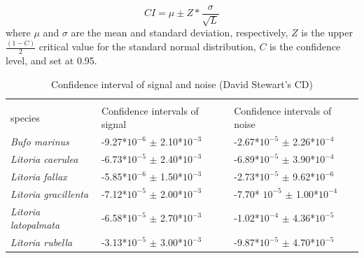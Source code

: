 \begin{equation}
CI=\mu \pm Z*\frac{\sigma}{\sqrt{L}}
\end{equation}
where $\mu$ and $\sigma$ are the mean and standard deviation, respectively, $Z$ is the upper $\frac{(1-C)}{2}$ critical value for the standard normal distribution, $C$ is the confidence level, and set at 0.95.




\begin{table}[htb!]
\centering
\caption[Confidence interval for CD]{Confidence interval of signal and noise (David Stewart's CD)}
\label{tab:CI_CD}
\begin{tabular}{lll}
\hline\hline
    \backslashbox{Frog \\ species}{Parameters}                      & Confidence intervals of signal & Confidence intervals of noise \\ \hline
\textit{Bufo marinus}        &  -9.27*$10^{-6}$ $\pm$ 2.10*$10^{-3}$ &  -2.67*$10^{-5}$ $\pm$ 2.26*$10^{-4}$                             \\ 
\textit{Litoria caerulea}    &      -6.73*$10^{-5}$ $\pm$ 2.40*$10^{-3}$     &                              -6.89*$10^{-5}$ $\pm$ 3.90*$10^{-4}$ \\ 
\textit{Litoria fallax}      &   -5.85*$10^{-6}$ $\pm$ 1.50*$10^{-3}$                             &                              -2.73*$10^{-5}$ $\pm$ 9.62*$10^{-6}$ \\ 
\textit{Litoria gracillenta} &     -7.12*$10^{-5}$ $\pm$ 2.00*$10^{-3}$                           &                              -7.70* $10^{-5}$ $\pm$ 1.00*$10^{-4}$ \\ 
\textit{Litoria latopalmata} &   -6.58*$10^{-5}$ $\pm$ 2.70*$10^{-3}$                            &                              -1.02*$10^{-4}$ $\pm$ 4.36*$10^{-5}$ \\ 
\textit{Litoria rubella}     &   -3.13*$10^{-5}$ $\pm$ 3.00*$10^{-3}$                           &                              -9.87*$10^{-5}$ $\pm$ 4.70*$10^{-5}$ \\ \hline\hline
\end{tabular}
\end{table}




